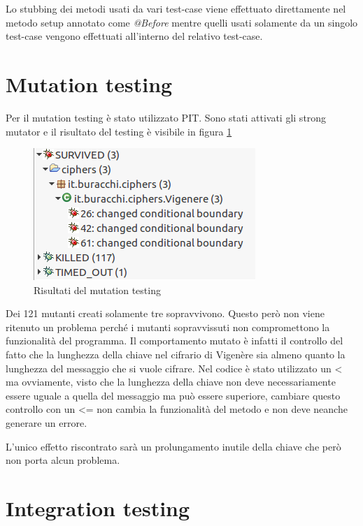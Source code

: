 		Lo stubbing dei metodi usati da vari test-case viene effettuato direttamente nel metodo setup annotato come \emph{@Before} mentre quelli usati solamente da un singolo test-case vengono effettuati all'interno del relativo test-case.
		
	\section{Mutation testing}
		Per il mutation testing è stato utilizzato PIT. Sono stati attivati gli strong mutator e il risultato del testing è visibile in figura \ref{fig:pit}
		
		\begin{figure}[h]
			\centering
			\includegraphics[scale=0.5]{img/PIT}
			\caption{Risultati del mutation testing}
			\label{fig:pit}
		\end{figure}
		
		Dei 121 mutanti creati solamente tre sopravvivono. Questo però non viene ritenuto un problema perché i mutanti sopravvissuti non compromettono la funzionalità del programma. Il comportamento mutato è infatti il controllo del fatto che la lunghezza della chiave nel cifrario di Vigenère sia almeno quanto la lunghezza del messaggio che si vuole cifrare. Nel codice è stato utilizzato un < ma ovviamente, visto che la lunghezza della chiave non deve necessariamente essere uguale a quella del messaggio ma può essere superiore, cambiare questo controllo con un <= non cambia la funzionalità del metodo e non deve neanche generare un errore.
		
		L'unico effetto riscontrato sarà un prolungamento inutile della chiave che però non porta alcun problema.
		
	\section{Integration testing}